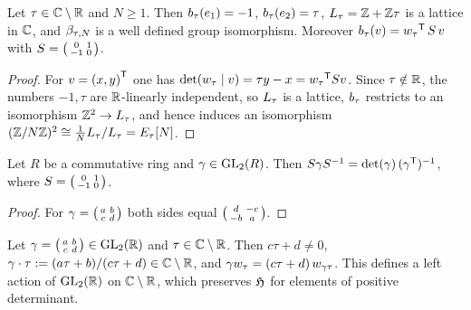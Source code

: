 \begin{lemma}\label{lem:lattice-coordinates}
Let $\tau \in \mathbb{C}\setminus\mathbb{R}$ and $N \geq 1$. Then
$b_{\tau}(e_{1}) = -1$,
$b_{\tau}(e_{2}) = \tau$,
$L_{\tau} = \mathbb{Z} + \mathbb{Z}\tau$ is a lattice in $\mathbb{C}$, and
$\beta_{\tau,N}$ is a well defined group isomorphism. Moreover
$b_{\tau}(v) = {w_{\tau}}^{\mathsf{T}}\,S\, v$ with
$S = \left(\begin{smallmatrix} 0 & 1 \\ -1 & 0 \end{smallmatrix}\right)$.
\end{lemma}

\begin{proof}
For $v = {(x,y)}^{\mathsf{T}}$ one has
$\det(w_{\tau}\mid v) = \tau y - x =
{w_{\tau}}^{\mathsf{T}} S v$. Since $\tau \notin \mathbb{R}$, the
numbers $-1, \tau$ are $\mathbb{R}$-linearly independent, so $L_{\tau}$ is
a lattice, $b_{\tau}$ restricts to an isomorphism
$\mathbb{Z}^{2} \to L_{\tau}$, and hence induces an isomorphism
$(\mathbb{Z}/N\mathbb{Z})^{2} \cong \tfrac{1}{N}L_{\tau}/L_{\tau}
= E_{\tau}[N]$.
\end{proof}

\begin{lemma}\label{lem:S-identity}
Let $R$ be a commutative ring and $\gamma \in \GL{2}{R}$. Then
$S \gamma S^{-1} = \det(\gamma)\,({\gamma}^{\mathsf{T}})^{-1}$,
where $S = \left(\begin{smallmatrix} 0 & 1 \\ -1 & 0 \end{smallmatrix}\right)$.
\end{lemma}

\begin{proof}
For $\gamma = \left(\begin{smallmatrix} a & b \\ c & d \end{smallmatrix}\right)$ both sides equal
$\left(\begin{smallmatrix} d & -c \\ -b & a \end{smallmatrix}\right)$.
\end{proof}

\begin{lemma}
\label{lem:mobius}
Let $\gamma = \smallMat{a}{b}{c}{d} \in \GL{2}{\RR}$ and
$\tau \in \mathbb{C}\setminus\mathbb{R}$. Then $c\tau + d \neq 0$,
$\gamma\cdot \tau := (a\tau+b)/(c\tau+d) \in \mathbb{C}\setminus\mathbb{R}$, and
$\gamma w_{\tau} = (c\tau + d)\,w_{\gamma\tau}$.
This defines a left action of $\GL{2}{\RR}$ on $\mathbb{C}\setminus\mathbb{R}$, which
preserves $\mathfrak{H}$ for elements of positive determinant.
\end{lemma}

